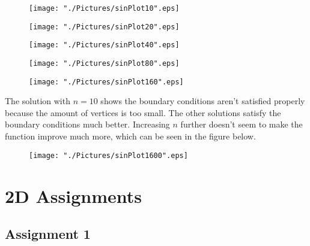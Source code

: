\documentclass[10pt,a4paper]{article}
\begin{document}
\begin{figure}[H]
	\centering
	\texttt{[image: "./Pictures/sinPlot10".eps]}
\end{figure}
\begin{figure}[H]
	\centering
	\texttt{[image: "./Pictures/sinPlot20".eps]}
\end{figure}
\begin{figure}[H]
	\centering
	\texttt{[image: "./Pictures/sinPlot40".eps]}
\end{figure}
\begin{figure}[H]
	\centering
	\texttt{[image: "./Pictures/sinPlot80".eps]}
\end{figure}
\begin{figure}[H]
	\centering
	\texttt{[image: "./Pictures/sinPlot160".eps]}
\end{figure}

The solution with $n=10$ shows the boundary conditions aren't satisfied properly because the amount of vertices is too small. 
The other solutions satisfy the boundary conditions much better. 
Increasing $n$ further doesn't seem to make the function improve much more, which can be seen in the figure below.
\begin{figure}[H]
	\centering
	\texttt{[image: "./Pictures/sinPlot1600".eps]}
\end{figure}

\newpage
\section{2D Assignments}
\subsection{Assignment 1}
\end{document}
